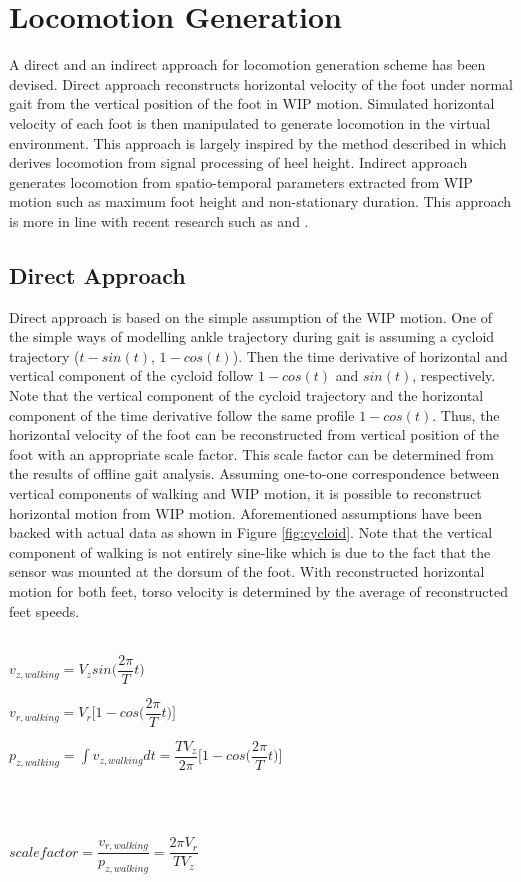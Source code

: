 \section{Locomotion Generation}

A direct and an indirect approach for locomotion generation scheme has been devised. Direct approach reconstructs horizontal velocity of the foot under normal gait from the vertical position of the foot in WIP motion. Simulated horizontal velocity of each foot is then manipulated to generate locomotion in the virtual environment. This approach is largely inspired by the method described in \cite{Fea08} which derives locomotion from signal processing of heel height. Indirect approach generates locomotion from spatio-temporal parameters extracted from WIP motion such as maximum foot height and non-stationary duration. This approach is more in line with recent research such as \cite{Bru13} and \cite{Tre16}.

\newpage
\subsection{Direct Approach}
Direct approach is based on the simple assumption of the WIP motion. One of the simple ways of modelling ankle trajectory during gait is assuming a cycloid trajectory ($t - sin(t)$, $1 - cos(t)$). Then the time derivative of horizontal and vertical component of the cycloid follow $1 - cos(t)$ and $sin(t)$, respectively. Note that the vertical component of the cycloid trajectory and the horizontal component of the time derivative follow the same profile $1 - cos(t)$. Thus, the horizontal velocity of the foot can be reconstructed from vertical position of the foot with an appropriate scale factor. This scale factor can be determined from the results of offline gait analysis. Assuming one-to-one correspondence between vertical components of walking and WIP motion, it is possible to reconstruct horizontal motion from WIP motion. Aforementioned assumptions have been backed with actual data as shown in Figure \ref{fig:cycloid}. Note that the vertical component of walking is not entirely sine-like which is due to the fact that the sensor was mounted at the dorsum of the foot. With reconstructed horizontal motion for both feet, torso velocity is determined by the average of reconstructed feet speeds.
\\\\
\centerline{$v_{z, walking} = V_{z}sin\Big(\dfrac{2\pi}{T}t\Big)$}
\centerline{$v_{r, walking} = V_{r}\Big[1 - cos\Big(\dfrac{2\pi}{T}t\Big)\Big]$}
\centerline{$p_{z, walking} = \int v_{z, walking}dt = \dfrac{TV_{z}}{2\pi}\Big[1 - cos\Big(\dfrac{2\pi}{T}t\Big)\Big]$}\\\\
\centerline{$scale factor = \dfrac{v_{r, walking}}{p_{z, walking}} = \dfrac{2\pi V_{r}}{TV_{z}}$}

